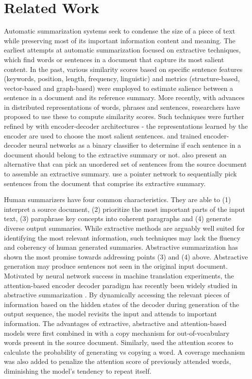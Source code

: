 \documentclass[letterpaper]{article} \usepackage{arXiv_V2_aaai_sty_mods}  \usepackage{times}  \usepackage{helvet} \usepackage{courier}  \usepackage[hyphens]{url}  \usepackage{graphicx} \usepackage[utf8]{inputenc} \usepackage[T1]{fontenc}    \usepackage{url}            \usepackage{booktabs}       \usepackage{amsfonts}       \usepackage{nicefrac}       \usepackage{multirow}
\begin{document}
\section{Related Work}
Automatic summarization systems seek to condense the size of a piece of text while preserving most of its important information content and meaning. The earliest attempts at automatic summarization focused on extractive techniques, which find words or sentences in a document that capture its most salient content.
In the past, various similarity scores based on specific sentence features (keywords, position, length, frequency, linguistic) and metrics (structure-based, vector-based and graph-based) were employed to estimate salience \cite{steinberger2004using,erkan2004lexrank} between a sentence in a document and its reference summary. More recently, with advances in distributed representations of words, phrases and sentences, researchers have proposed to use these to compute similarity scores. Such techniques were further refined by \cite{nallapati2016classify,cheng2016neural,chen2018fast} with encoder-decoder architectures - the representations learned by the encoder are used to choose the most salient sentences.
\cite{cheng2016neural} and \cite{nallapati2016classify} trained encoder-decoder neural networks as a binary classifier to determine if each sentence in a document should belong to the extractive summary or not. \cite{nallapati2016abstractive} also present an alternative that can pick an unordered set of sentences from the source document to assemble an extractive summary. \cite{chen2018fast} use a pointer network \cite{vinyals2015pointer} to sequentially pick sentences from the document that comprise its extractive summary.

Human summarizers have four common characteristics. They are able to (1) interpret a source document, (2) prioritize the most important parts of the input text, (3) paraphrase key concepts into coherent paragraphs and (4) generate diverse output summaries. While extractive methods are arguably well suited for identifying the most relevant information, such techniques may lack the fluency and coherency of human generated summaries. Abstractive summarization has shown the most promise towards addressing points (3) and (4) above. Abstractive generation may produce sentences not seen in the original input document. Motivated by neural network success in machine translation experiments, the attention-based encoder decoder paradigm has recently been widely studied in abstractive summarization \cite{Rush2015AbsAttn,nallapati2016abstractive,chopra2016abstractive}. By dynamically accessing the relevant pieces of information based on the hidden states of the decoder during generation of the output sequence, the model revisits the input and attends to important information. The advantages of extractive, abstractive and attention-based models were first combined in \cite{gu2016copy} with a copy mechanism for out-of-vocabulary words present in the source document. Similarly, \cite{asee2017pointer} used the attention scores to calculate the probability of generating vs copying a word. A coverage mechanism was also added to penalize the attention score of previously attended words, diminishing the model's tendency to repeat itself.
\end{document}
